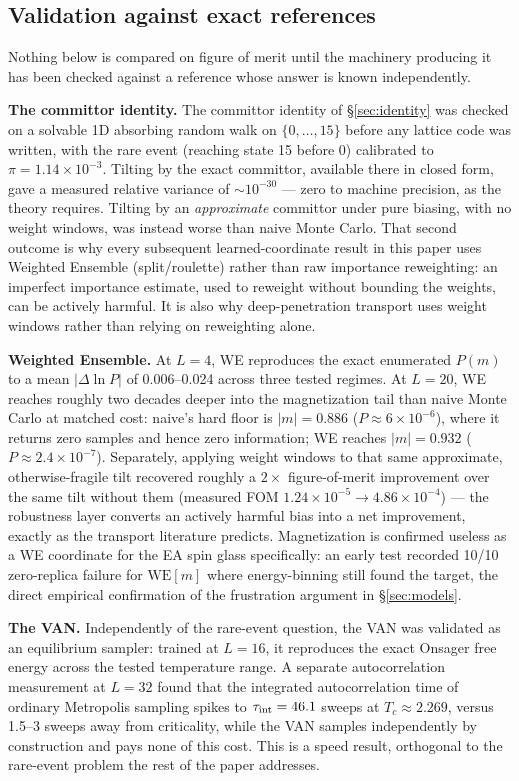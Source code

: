 \documentclass[a4paper,fleqn]{cas-sc}
\begin{document}
	\subsection{Validation against exact references}\label{sec:validation}
	Nothing below is compared on figure of merit until the machinery producing it has been
	checked against a reference whose answer is known independently.
	
	\textbf{The committor identity.} The committor identity of \S\ref{sec:identity} was checked on a solvable 1D absorbing
	random walk on $\{0,\dots,15\}$ before any lattice code was written, with the rare event
	(reaching state 15 before 0) calibrated to $\pi=1.14\times10^{-3}$. Tilting by the exact
	committor, available there in closed form, gave a measured relative variance of
	$\sim\!10^{-30}$ --- zero to machine precision, as the theory requires. Tilting by an
	\emph{approximate} committor under pure biasing, with no weight windows, was instead worse
	than naive Monte Carlo. That second outcome is why every subsequent learned-coordinate result
	in this paper uses Weighted Ensemble (split/roulette) rather than raw importance reweighting:
	an imperfect importance estimate, used to reweight without bounding the weights, can be
	actively harmful. It is also why deep-penetration transport uses weight windows rather than
	relying on reweighting alone.
	
	\textbf{Weighted Ensemble.} At $L=4$, WE reproduces the exact enumerated $P(m)$ to a mean $|\Delta\ln P|$ of
	0.006--0.024 across three tested regimes. At $L=20$, WE reaches roughly two decades deeper
	into the magnetization tail than naive Monte Carlo at matched cost: naive's hard floor is
	$|m|=0.886$ ($P\approx6\times10^{-6}$), where it returns zero samples and hence zero
	information; WE reaches $|m|=0.932$ ($P\approx2.4\times10^{-7}$). Separately, applying
	weight windows to that same approximate, otherwise-fragile tilt recovered roughly a $2\times$ figure-of-merit improvement
	over the same tilt without them (measured FOM $1.24\times10^{-5}\to4.86\times10^{-4}$) ---
	the robustness layer converts an actively harmful bias into a net improvement, exactly as
	the transport literature predicts. Magnetization is confirmed useless as a WE coordinate
	for the EA spin glass specifically: an early test recorded 10/10 zero-replica failure for
	$\mathrm{WE}[m]$ where energy-binning still found the target, the direct empirical
	confirmation of the frustration argument in \S\ref{sec:models}.
	
	\textbf{The VAN.} Independently of the rare-event question, the VAN was validated as an
	equilibrium sampler: trained at $L=16$, it reproduces the exact Onsager free energy across
	the tested temperature range. A separate autocorrelation measurement at $L=32$ found that the
	integrated autocorrelation time of ordinary Metropolis sampling spikes to
	$\tau_{\rm int}=46.1$ sweeps at $T_c\approx2.269$, versus 1.5--3 sweeps away from
	criticality, while the VAN samples independently by construction and pays none of this
	cost. This is a speed result, orthogonal to the rare-event problem the rest of the paper
	addresses.
	
\end{document}
